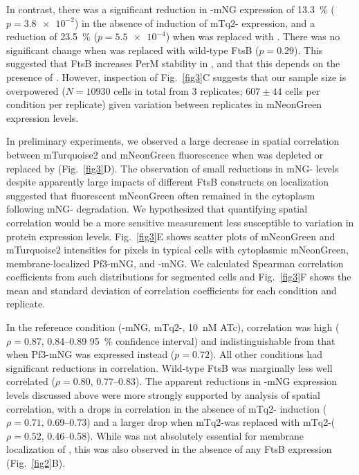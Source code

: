 \documentclass[pdflatex,sn-basic]{sn-jnl}%
\begin{document}
In contrast, there was a significant reduction in \permN{}-mNG expression of \qty{13.3}{\percent} ($p=\num{3.8e-2}$) in the absence of induction of mTq2-\ftsbdLQ{} expression, and a reduction of \qty{23.5}{\percent} ($p=\num{5.5e-4}$) when \ftsbdLQ{} was replaced with \ftsbdLQdH{}. There was no significant change when \ftsbdLQ{} was replaced with wild-type FtsB ($p=0.29$). This suggested that FtsB increases PerM stability in \ec{}, and that this depends on the presence of \ftsbH{}. However, inspection of Fig.~\ref{fig3}C suggests that our sample size is overpowered ($N=\num{10930}$ cells in total from 3 replicates; $607 \pm 44$ cells per condition per replicate) given variation between replicates in mNeonGreen expression levels. 

In preliminary experiments, we observed a large decrease in spatial correlation between mTurquoise2 and mNeonGreen fluorescence when \ftsbdLQ{} was depleted or replaced by \ftsbdLQdH{} (Fig.~\ref{fig3}D). The observation of small reductions in mNG-\permN{} levels despite apparently large impacts of different FtsB constructs on localization suggested that fluorescent mNeonGreen often remained in the cytoplasm following mNG-\permN{} degradation. We hypothesized that quantifying spatial correlation would be a more sensitive measurement less susceptible to variation in protein expression levels. Fig.~\ref{fig3}E shows scatter plots of mNeonGreen and mTurquoise2 intensities for pixels in typical cells with cytoplasmic mNeonGreen, membrane-localized Pf3-mNG, and \permN{}-mNG. We calculated Spearman correlation coefficients from such distributions for segmented cells and Fig.~\ref{fig3}F shows the mean and standard deviation of correlation coefficients for each condition and replicate.

In the reference condition (\permN{}-mNG, mTq2-\ftsbdLQ, \qty{10}{nM} ATc), correlation was high ($\rho = 0.87$, 0.84--0.89 \qty{95}{\percent} confidence interval) and indistinguishable from that when Pf3-mNG was expressed instead ($p = 0.72$). All other conditions had significant reductions in correlation. Wild-type FtsB was marginally less well correlated ($\rho = 0.80$, 0.77--0.83). The apparent reductions in \permN{}-mNG expression levels discussed above were more strongly supported by analysis of spatial correlation, with a drops in correlation in the absence of mTq2-\ftsbdLQ{} induction ($\rho = 0.71$, 0.69--0.73) and a larger drop when mTq2-\ftsbdLQ was replaced with mTq2-\ftsbdLQdH ($\rho = 0.52$, 0.46--0.58). While \ftsbLQ{} was not absolutely essential for membrane localization of \permN{}, this was also observed in the absence of any FtsB expression (Fig.~\ref{fig2}B).
\end{document}
